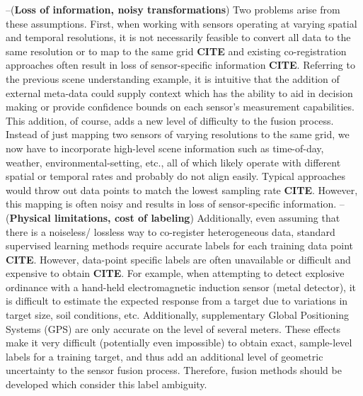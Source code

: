 \newline \vspace{1cm} \noindent --(\textbf{Loss of information, noisy transformations}) \newline
Two problems arise from these assumptions.  First, when working with sensors operating at varying spatial and temporal resolutions, it is not necessarily feasible to convert all data to the same resolution or to map to the same grid \textbf{CITE} and existing co-registration approaches often result in loss of sensor-specific information \textbf{CITE}.  Referring to the previous scene understanding example, it is intuitive that the addition of external meta-data could supply context which has the ability to aid in decision making or provide confidence bounds on each sensor's measurement capabilities.  This addition, of course, adds a new level of difficulty to the fusion process.  Instead of just mapping two sensors of varying resolutions to the same grid, we now have to incorporate high-level scene information such as time-of-day, weather, environmental-setting, etc., all of which likely operate with different spatial or temporal rates and probably do not align easily.  Typical approaches would throw out data points to match the lowest sampling rate \textbf{CITE}.  However, this mapping is often noisy and results in loss of sensor-specific information.
\newline 
\vspace{1cm}\noindent --(\textbf{Physical limitations, cost of labeling}) \newline
Additionally, even assuming that there is a noiseless/ lossless way to co-register heterogeneous data, standard supervised learning methods require accurate labels for each training data point \textbf{CITE}.  However, data-point specific labels are often unavailable or difficult and expensive to obtain \textbf{CITE}.  For example, when attempting to detect explosive ordinance with a hand-held electromagnetic induction sensor (metal detector), it is difficult to estimate the expected response from a target due to variations in target size, soil conditions, etc.   Additionally, supplementary Global Positioning Systems (GPS) are only accurate on the level of several meters. These effects make it very difficult (potentially even impossible) to obtain exact, sample-level labels for a training target, and thus add an additional level of geometric uncertainty to the sensor fusion process.  Therefore, fusion methods should be developed which consider this label ambiguity.
\newline

